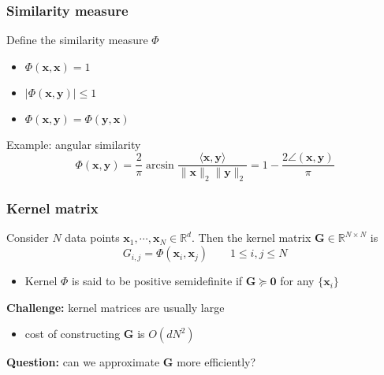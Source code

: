 \documentclass[compress,
mathserif,wide,%
]{beamer}
\begin{document}
\begin{frame}
\frametitle{Similarity measure}  

Define the similarity measure $\Phi$

	\begin{itemize}
		\itemsep0.5em
		\item $\Phi(\bm{x}, \bm{x})=1$
		\item $|\Phi(\bm{x}, \bm{y})| \leq 1$
		\item $\Phi(\bm{x}, \bm{y}) = \Phi(\bm{y}, \bm{x})$
	\end{itemize}

\vfill

Example: angular similarity
%
\[
	\Phi(\bm{x},\bm{y})=\frac{2}{\pi}\arcsin\frac{\langle\bm{x},\bm{y}\rangle}{\|\bm{x}\|_{2}\|\bm{y}\|_{2}}=1-\frac{2\angle(\bm{x},\bm{y})}{\pi}
\]
%


\end{frame}



\begin{frame}
\frametitle{Kernel matrix} 

	Consider $N$ data points $\bm{x}_1,\cdots,\bm{x}_N\in \mathbb{R}^d$. Then the kernel matrix $\bm{G}\in \mathbb{R}^{N\times N}$ is 
	\begin{equation*}
		G_{i,j} = \Phi (\bm{x}_i, \bm{x}_j) \qquad 1\leq  i,j \leq N
	\end{equation*}


	\begin{itemize}
		\item Kernel $\Phi$ is said to be positive semidefinite if $\bm{G}\succeq \bm{0}$ for any  $\{\bm{x}_i\}$
	\end{itemize}


	\vfill

	{\bf Challenge:} kernel matrices are usually large 
	\begin{itemize}
		\itemsep0.3em
		\item cost of constructing $\bm{G}$ is $O(dN^2)$ 
	\end{itemize}

	\medskip
	{\bf Question:} can we approximate $\bm{G}$ more efficiently?

\end{frame}
\end{document}
